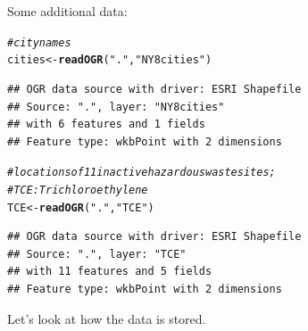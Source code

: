 \documentclass{article}\usepackage[]{graphicx}\usepackage[]{color}
\makeatletter
\newcommand{\hlstr}[1]{\textcolor[rgb]{0.192,0.494,0.8}{#1}}%
\newcommand{\hlcom}[1]{\textcolor[rgb]{0.678,0.584,0.686}{\textit{#1}}}%
\newcommand{\hlstd}[1]{\textcolor[rgb]{0.345,0.345,0.345}{#1}}%
\newcommand{\hlkwb}[1]{\textcolor[rgb]{0.69,0.353,0.396}{#1}}%
\newcommand{\hlkwd}[1]{\textcolor[rgb]{0.737,0.353,0.396}{\textbf{#1}}}%
\newenvironment{kframe}{%
 \def\at@end@of@kframe{}%
 \ifinner\ifhmode%
  \def\at@end@of@kframe{\end{minipage}}%
  \begin{minipage}{\columnwidth}%
 \fi\fi%
 \def\FrameCommand##1{\hskip\@totalleftmargin \hskip-\fboxsep
 \colorbox{shadecolor}{##1}\hskip-\fboxsep
     \hskip-\linewidth \hskip-\@totalleftmargin \hskip\columnwidth}%
 \MakeFramed {\advance\hsize-\width
   \@totalleftmargin\z@ \linewidth\hsize
   \@setminipage}}%
 {\par\unskip\endMakeFramed%
 \at@end@of@kframe}
\newenvironment{knitrout}{}{} %
\makeatother
\begin{document}
Some additional data:

\begin{knitrout}
\color{fgcolor}\begin{kframe}
\begin{alltt}
\hlcom{#city names}
\hlstd{cities} \hlkwb{<-} \hlkwd{readOGR}\hlstd{(}\hlstr{"."}\hlstd{,} \hlstr{"NY8cities"}\hlstd{)}
\end{alltt}
\begin{verbatim}
## OGR data source with driver: ESRI Shapefile 
## Source: ".", layer: "NY8cities"
## with 6 features and 1 fields
## Feature type: wkbPoint with 2 dimensions
\end{verbatim}
\begin{alltt}
\hlcom{#locations of 11 inactive hazardous waste sites; }
\hlcom{# TCE: Trichloroethylene}
\hlstd{TCE} \hlkwb{<-} \hlkwd{readOGR}\hlstd{(}\hlstr{"."}\hlstd{,} \hlstr{"TCE"}\hlstd{)}
\end{alltt}
\begin{verbatim}
## OGR data source with driver: ESRI Shapefile 
## Source: ".", layer: "TCE"
## with 11 features and 5 fields
## Feature type: wkbPoint with 2 dimensions
\end{verbatim}
\end{kframe}
\end{knitrout}

Let's look at how the data is stored.
\end{document}
